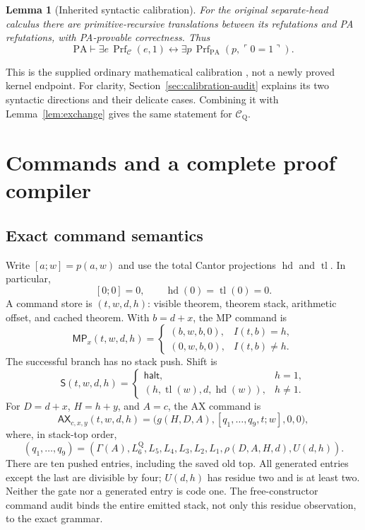 \documentclass[11pt,letterpaper]{article}
\newcommand{\PA}{\mathrm{PA}}
\newcommand{\Prf}{\operatorname{Prf}}
\newcommand{\CQ}{\mathcal C_{\mathrm Q}}
\newcommand{\CC}{\mathcal C}
\newtheorem{lemma}[theorem]{Lemma}
\begin{document}
\begin{lemma}[Inherited syntactic calibration]\label{lem:inherited}
For the original separate-head calculus there are primitive-recursive
translations between its refutations and PA refutations, with PA-provable
correctness. Thus
\[
 \PA\vdash \exists e\,\Prf_{\CC}(e,1)
       \leftrightarrow \exists p\,\Prf_{\PA}(p,\ulcorner0=1\urcorner).
\]
\end{lemma}

This is the supplied ordinary mathematical calibration
\cite{primary,separate,diagonal}, not a newly proved kernel endpoint.
For clarity, Section~\ref{sec:calibration-audit} explains its two
syntactic directions and their delicate cases. Combining it with
Lemma~\ref{lem:exchange} gives the same statement for $\CQ$.

\section{Commands and a complete proof compiler}\label{sec:commands}

\subsection{Exact command semantics}

Write $[a;w]=p(a,w)$ and use the total Cantor projections
$\operatorname{hd}$ and $\operatorname{tl}$. In particular,
\[
 [0;0]=0,\qquad\operatorname{hd}(0)=\operatorname{tl}(0)=0.
\]
A command store is $(t,w,d,h)$: visible theorem, theorem stack,
arithmetic offset, and cached theorem. With $b=d+x$, the MP command is
\begin{equation}\label{eq:mp}
 \mathsf{MP}_x(t,w,d,h)=
 \begin{cases}
 (b,w,b,0),&I(t,b)=h,\\
 (0,w,b,0),&I(t,b)\ne h.
 \end{cases}
\end{equation}
The successful branch has no stack push. Shift is
\begin{equation}\label{eq:shift}
 \mathsf S(t,w,d,h)=
 \begin{cases}
 \mathsf{halt},&h=1,\\
 (h,\operatorname{tl}(w),d,\operatorname{hd}(w)),&h\ne1.
 \end{cases}
\end{equation}
For $D=d+x$, $H=h+y$, and $A=c$, the AX command is
\begin{equation}\label{eq:ax}
 \mathsf{AX}_{c,x,y}(t,w,d,h)=
 \bigl(g(H,D,A),[q_1,\ldots,q_9,t;w],0,0\bigr),
\end{equation}
where, in stack-top order,
\[
 (q_1,\ldots,q_9)=
 (\Gamma(A),L_6^{\mathrm Q},L_5,L_4,L_3,L_2,L_1,
                   \rho(D,A,H,d),U(d,h)).
\]
There are ten pushed entries, including the saved old top. All generated
entries except the last are divisible by four; $U(d,h)$ has residue two
and is at least two. Neither the gate nor a generated entry is code one.
The free-constructor command audit binds the entire emitted stack, not
only this residue observation, to the exact grammar.
\end{document}
